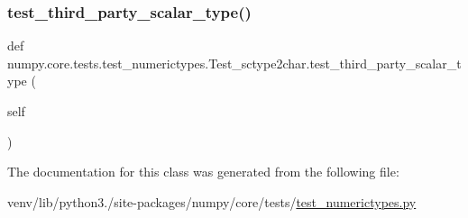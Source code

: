 \subsubsection{\texorpdfstring{test\+\_\+third\+\_\+party\+\_\+scalar\+\_\+type()}{test\_third\_party\_scalar\_type()}}
{\footnotesize\ttfamily def numpy.\+core.\+tests.\+test\+\_\+numerictypes.\+Test\+\_\+sctype2char.\+test\+\_\+third\+\_\+party\+\_\+scalar\+\_\+type (\begin{DoxyParamCaption}\item[{}]{self }\end{DoxyParamCaption})}



The documentation for this class was generated from the following file\+:\begin{DoxyCompactItemize}
\item 
venv/lib/python3./site-\/packages/numpy/core/tests/\hyperlink{test__numerictypes_8py}{test\+\_\+numerictypes.\+py}\end{DoxyCompactItemize}
